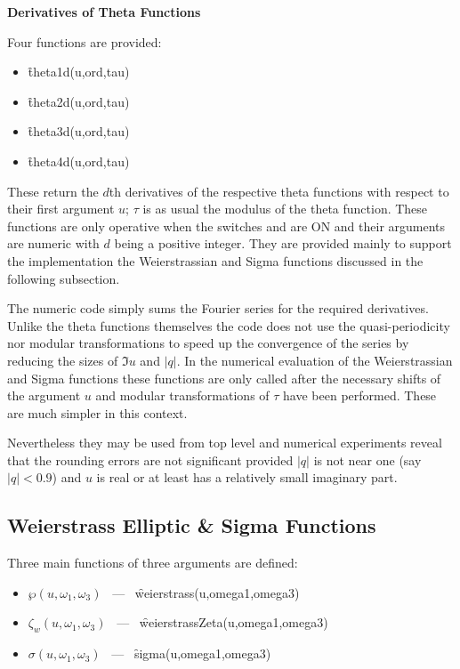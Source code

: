 \textbf{Derivatives of Theta Functions}


\hypertarget{THETAD}{}
 
Four functions are provided:
\begin{itemize}
\item \f{theta1d(u,ord,tau)}
\item \f{theta2d(u,ord,tau)}
\item \f{theta3d(u,ord,tau)}
\item \f{theta4d(u,ord,tau)}
\end{itemize}
These return the $d$th derivatives of the respective theta functions
with respect to their first argument $u$; $\tau$ is as usual the modulus
of the theta function. These functions are only operative when the switches
 and  are ON and their arguments are numeric with
$d$ being a positive integer.  They are provided mainly to support the implementation
the Weierstrassian and Sigma functions discussed in the following subsection.

The numeric code simply sums the Fourier series for the required derivatives.
Unlike the theta functions themselves the code does not use the quasi-periodicity nor
modular transformations to speed  up the convergence of the series by reducing the sizes
of $\Im u$ and $|q|$.  In the numerical evaluation of the Weierstrassian and Sigma functions
these functions are only called after the necessary shifts of the argument $u$ and modular
transformations of $\tau$ have been performed. These are much simpler in this context.

Nevertheless they may be used from top level and numerical experiments reveal that the rounding
errors are not significant provided $|q|$ is not near one (say $|q|<0.9$)
and $u$ is real or at least has a relatively small imaginary part.

\subsection{Weierstrass Elliptic \& Sigma Functions}
Three main functions of three arguments are defined:
\hypertarget{WEIERSTRASS}{}
\hypertarget{WEIERSTRASSZETA}{}
\hypertarget{SIGMA}{}
\hypertarget{operator:SIGMA}{}
\hypertarget{operator:WEIERSTRASS}{}
\hypertarget{operator:WEIERSTRASSZETA}{}
 
\begin{itemize}
\item  $\wp(u, \omega_1, \omega_3)$ \ --- \ \f{weierstrass(u,omega1,omega3)}
\item $\zeta_w(u, \omega_1, \omega_3)$ \ --- \ \f{weierstrassZeta(u,omega1,omega3)}
\item $\sigma(u, \omega_1, \omega_3)$ \ --- \ \f{sigma(u,omega1,omega3)}
\end{itemize}


